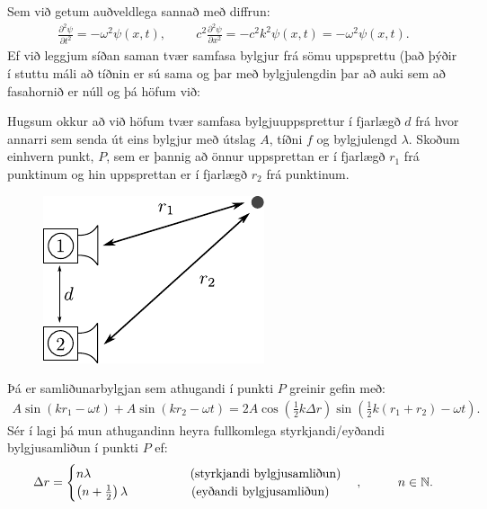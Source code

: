 \ifdefined \wholebook \else\documentclass[oneside]{book}\usepackage{EdlBook}\graphicspath{{figures/}}
\begin{document}
Sem við getum auðveldlega sannað með diffrun:
\begin{align*}
    \frac{\partial^2\psi}{\partial t^2} = -\omega^2 \psi(x,t), \hspace{1cm} c^2\frac{\partial^2 \psi}{\partial x^2} = -c^2k^2\psi(x,t) = -\omega^2 \psi(x,t).
\end{align*}
Ef við leggjum síðan saman tvær samfasa bylgjur frá sömu uppsprettu (það þýðir í stuttu máli að tíðnin er sú sama og þar með bylgjulengdin þar að auki sem að fasahornið er núll og  þá höfum við:

\begin{tcolorbox}
\begin{theorem}
Hugsum okkur að við höfum tvær samfasa bylgjuuppsprettur í fjarlægð $d$ frá hvor annarri sem senda út eins bylgjur með útslag $A$, tíðni $f$ og bylgjulengd $\lambda$. Skoðum einhvern punkt, $P$, sem er þannig að önnur uppsprettan er í fjarlægð $r_1$ frá punktinum og hin uppsprettan er í fjarlægð $r_2$ frá punktinum.
\begin{figure}[H]
    \centering
    \vspace{-0.5cm}
    \includegraphics{figures/hatalari-dist.pdf}
\end{figure}
Þá er samliðunarbylgjan sem athugandi í punkti $P$ greinir gefin með:
\begin{align*} 
A\sin(kr_1-\omega t) + A\sin(kr_2 - \omega t) = 2A\cos(\frac{1}{2}k\Delta r)\sin(\frac{1}{2}k(r_1+r_2)-\omega t).
\end{align*}
Sér í lagi þá mun athugandinn heyra fullkomlega styrkjandi/eyðandi bylgjusamliðun í punkti $P$ ef:
\begin{align*}
    \Delta r = \begin{cases}
    n \lambda \hspace{2.8cm} \text{(styrkjandi bylgjusamliðun)} \\
    \left(n+\frac{1}{2}\right)\lambda \hspace{1.8cm} \text{(eyðandi bylgjusamliðun)}
    \end{cases},\hspace{1cm} n \in \mathbb{N}.
\end{align*}
\end{theorem}
\end{tcolorbox}
\end{document}
